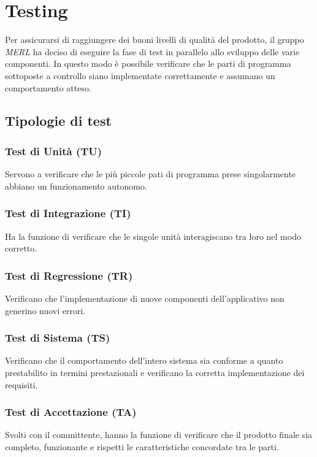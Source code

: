 \chapter{Testing}
Per assicurarsi di raggiungere dei buoni livelli di qualità del prodotto, il gruppo \textit{MERL} ha deciso di eseguire la fase di test in parallelo allo sviluppo delle varie componenti. In questo modo è possibile verificare che le parti di programma sottoposte a controllo siano implementate correttamente e assumano un comportamento atteso.
\section{Tipologie di test}
    \subsection{Test di Unità (TU)}  Servono a verificare che le più piccole pati di programma prese singolarmente abbiano un funzionamento autonomo.
    \subsection{Test di Integrazione (TI)} Ha la funzione di verificare che le singole unità interagiscano tra loro nel modo corretto.
    \subsection{Test di Regressione (TR)} Verificano che l'implementazione di nuove componenti dell'applicativo non generino nuovi errori.
    \subsection{Test di Sistema (TS)} Verificano che il comportamento dell'intero sistema sia conforme a quanto prestabilito in termini prestazionali e verificano la corretta implementazione dei requisiti.
    \subsection{Test di Accettazione (TA)} Svolti con il committente, hanno la funzione di verificare che il prodotto
        finale sia completo, funzionante e rispetti le caratteristiche concordate tra le parti.


